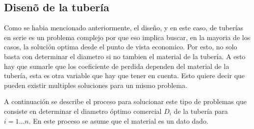 \documentclass[10pt, oneside]{article}
\begin{document}
\subsection{Disen\~o de la  tuber\'ia}
Como se habia mencionado anteriormente, el dise\~no, y en este caso, de tuber\'ias en serie es un problema complejo por que eso implica buscar, en la mayoria de los casos, la soluci\'on optima desde el punto de vista economico. Por esto, no solo basta con determinar el diametro si no tambien el material de la tuber\'ia. A esto hay que sumarle que los coeficiente de perdida dependen del material de la tuber\'ia, esta es otra variable que hay que tener en cuenta. Esto quiere decir que pueden existir multiples soluciones para un mismo problema. 

A continuaci\'on se describe el proceso para solucionar este tipo de problemas que consiste en determinar el diametro \'optimo comercial $D_i$ de la tuber\'ia para $i=1...n$. En este proceso se asume que el material es un dato dado. 
\end{document}
